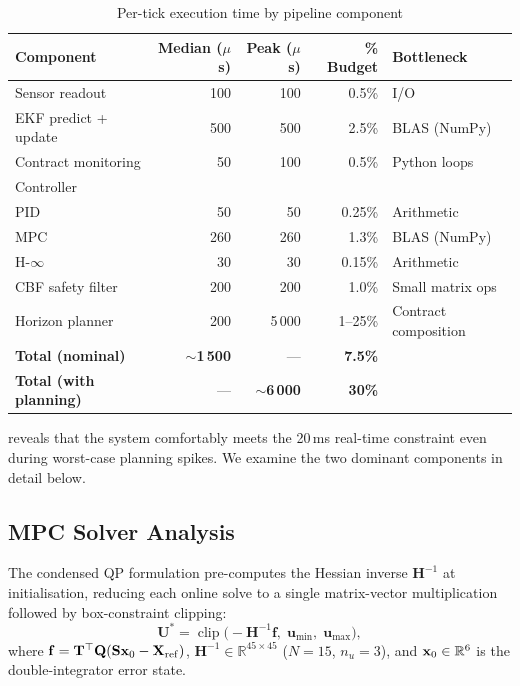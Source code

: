 \begin{table}[htbp]
    \centering
    \caption{Per-tick execution time by pipeline component}
    \label{tab:component_timing}
    \begin{tabular}{@{}lrrrl@{}}
        \toprule
        \textbf{Component} & \textbf{Median ($\mu$s)} & \textbf{Peak ($\mu$s)} & \textbf{\% Budget} & \textbf{Bottleneck} \\
        \midrule
        Sensor readout           & 100  & 100   & 0.5\%  & I/O \\
        EKF predict + update     & 500  & 500   & 2.5\%  & BLAS (NumPy) \\
        Contract monitoring      & 50   & 100   & 0.5\%  & Python loops \\
        Controller               &      &       &        & \\
        \quad PID                & 50   & 50    & 0.25\% & Arithmetic \\
        \quad MPC                & 260  & 260   & 1.3\%  & BLAS (NumPy) \\
        \quad H-$\infty$        & 30   & 30    & 0.15\% & Arithmetic \\
        CBF safety filter        & 200  & 200   & 1.0\%  & Small matrix ops \\
        Horizon planner          & 200  & 5\,000 & 1--25\% & Contract composition \\
        \midrule
        \textbf{Total (nominal)} & \textbf{$\sim$1\,500} & --- & \textbf{7.5\%} & \\
        \textbf{Total (with planning)} & --- & \textbf{$\sim$6\,000} & \textbf{30\%} & \\
        \bottomrule
    \end{tabular}
\end{table}

 reveals that the system comfortably meets the 20\,ms real-time constraint even during worst-case planning spikes. We examine the two dominant components in detail below.

\subsection{MPC Solver Analysis}

The condensed QP formulation pre-computes the Hessian inverse $\mathbf{H}^{-1}$ at initialisation, reducing each online solve to a single matrix-vector multiplication followed by box-constraint clipping:
\begin{equation}
    \mathbf{U}^{*} = \operatorname{clip}\!\bigl(-\mathbf{H}^{-1}\mathbf{f},\; \mathbf{u}_{\min},\; \mathbf{u}_{\max}\bigr),
    \label{eq:condensed_qp}
\end{equation}
where $\mathbf{f} = \mathbf{T}^{\top}\mathbf{Q}(\mathbf{S}\mathbf{x}_0 - \mathbf{X}_{\mathrm{ref}})$, $\mathbf{H}^{-1} \in \mathbb{R}^{45 \times 45}$ ($N=15$, $n_u=3$), and $\mathbf{x}_0 \in \mathbb{R}^{6}$ is the double-integrator error state.

